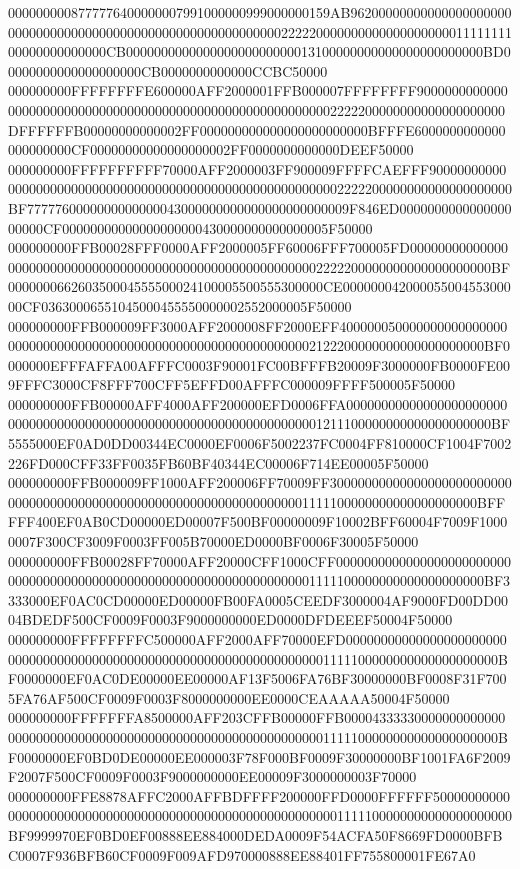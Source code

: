 0000000008777776400000007991000000999000000159AB9620000000000000000000000000000000000000000000000000000000000022222000000000000000000001111111100000000000000CB000000000000000000000000013100000000000000000000000BD00000000000000000000CB0000000000000CCBC50000
000000000FFFFFFFFE600000AFF2000001FFB000007FFFFFFFF900000000000000000000000000000000000000000000000000000000002222200000000000000000000DFFFFFFB00000000000002FF000000000000000000000000BFFFE6000000000000000000000CF00000000000000000002FF0000000000000DEEF50000
000000000FFFFFFFFFF70000AFF2000003FF900009FFFFCAEFFF90000000000000000000000000000000000000000000000000000000002222200000000000000000000BF7777760000000000000043000000000000000000000009F846ED000000000000000000000CF00000000000000000000430000000000000005F50000
000000000FFB00028FFF0000AFF2000005FF60006FFF700005FD00000000000000000000000000000000000000000000000000000000002222200000000000000000000BF000000066260350004555500024100005500555300000CE00000004200005500455300000CF03630006551045000455550000002552000005F50000
000000000FFB000009FF3000AFF2000008FF2000EFF40000005000000000000000000000000000000000000000000000000000000000002122200000000000000000000BF0000000EFFFAFFA00AFFFC0003F90001FC00BFFFB20009F3000000FB0000FE009FFFC3000CF8FFF700CFF5EFFD00AFFFC000009FFFF500005F50000
000000000FFB00000AFF4000AFF200000EFD0006FFA00000000000000000000000000000000000000000000000000000000000000000001211100000000000000000000BF5555000EF0AD0DD00344EC0000EF0006F5002237FC0004FF810000CF1004F7002226FD000CFF33FF0035FB60BF40344EC00006F714EE00005F50000
000000000FFB000009FF1000AFF200006FF70009FF300000000000000000000000000000000000000000000000000000000000000000001111100000000000000000000BFFFFF400EF0AB0CD00000ED00007F500BF00000009F10002BFF60004F7009F10000007F300CF3009F0003FF005B70000ED0000BF0006F30005F50000
000000000FFB00028FF70000AFF20000CFF1000CFF000000000000000000000000000000000000000000000000000000000000000000001111100000000000000000000BF3333000EF0AC0CD00000ED00000FB00FA0005CEEDF3000004AF9000FD00DD0004BDEDF500CF0009F0003F9000000000ED0000DFDEEEF50004F50000
000000000FFFFFFFFC500000AFF2000AFF70000EFD000000000000000000000000000000000000000000000000000000000000000000001111100000000000000000000BF0000000EF0AC0DE00000EE00000AF13F5006FA76BF30000000BF0008F31F7005FA76AF500CF0009F0003F8000000000EE0000CEAAAAA50004F50000
000000000FFFFFFFA8500000AFF203CFFB00000FFB000043333300000000000000000000000000000000000000000000000000000000001111100000000000000000000BF0000000EF0BD0DE00000EE000003F78F000BF0009F30000000BF1001FA6F2009F2007F500CF0009F0003F9000000000EE00009F3000000003F70000
000000000FFE8878AFFC2000AFFBDFFFF200000FFD0000FFFFFF50000000000000000000000000000000000000000000000000000000001111100000000000000000000BF9999970EF0BD0EF00888EE884000DEDA0009F54ACFA50F8669FD0000BFBC0007F936BFB60CF0009F009AFD970000888EE88401FF755800001FE67A0
